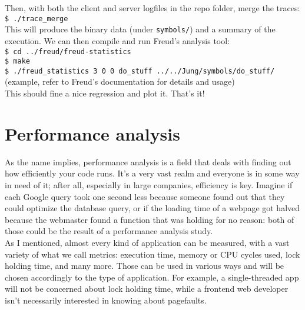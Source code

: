        Then, with both the client and server logfiles in the repo folder, merge the traces:\\

        \texttt{\$ ./trace\_merge}\\

        This will produce the binary data (under \texttt{symbols/}) and a summary of the execution.
        We can then compile and run Freud's analysis tool:\\

        \texttt{\$ cd ../freud/freud-statistics}\\

        \texttt{\$ make}\\

        \texttt{\$ ./freud\_statistics 3 0 0 do\_stuff ../../Jung/symbols/do\_stuff/}
        (example, refer to Freud's documentation for details and usage)\\

        This should fine a nice regression and plot it. That's it!


\chapter{Performance analysis}


    As the name implies, performance analysis is a field that deals with finding out
    how efficiently your code runs. It's a very vast realm and everyone is in some
    way in need of it; after all, especially in large companies, efficiency is key. Imagine if
    each Google query took one second less because someone found out that they could
    optimize the database query, or if the loading time of a webpage got halved because the
    webmaster found a function that was holding for no reason: both of those could be the result
    of a performance analysis study.\\

    As I mentioned, almost every kind of application can be measured, with a vast variety of what we call metrics:
    execution time, memory or CPU cycles used, lock holding time, and many more. Those can be used in
    various ways and will be chosen accordingly to the type of application. For example, a single-threaded app
    will not be concerned about lock holding time, while a frontend web developer isn't 
    necessarily interested in knowing about pagefaults.\\

